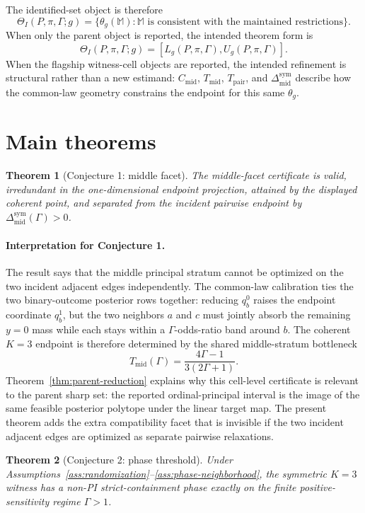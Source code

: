 \documentclass[11pt]{article}
\theoremstyle{definition}
\theoremstyle{plain}
\newtheorem{theorem}{Theorem}
\theoremstyle{remark}
\begin{document}
The identified-set object is therefore
\[
  \Theta_I(P,\pi,\Gamma;g)
  =
  \{\theta_g(\mathbb M): \mathbb M \text{ is consistent with the maintained restrictions}\}.
\]
When only the parent object is reported, the intended theorem form is
\[
  \Theta_I(P,\pi,\Gamma;g)=[L_g(P,\pi,\Gamma),U_g(P,\pi,\Gamma)].
\]
When the flagship witness-cell objects are reported, the intended refinement is structural rather than a new estimand: \(C_{\mathrm{mid}}\), \(T_{\mathrm{mid}}\), \(T_{\mathrm{pair}}\), and \(\Delta_{\mathrm{mid}}^{\mathrm{sym}}\) describe how the common-law geometry constrains the endpoint for this same \(\theta_g\).

\section{Main theorems}
\begin{theorem}[Conjecture 1: middle facet]\label{thm:middle-facet}
The middle-facet certificate is valid, irredundant in the one-dimensional endpoint projection, attained by the displayed coherent point, and separated from the incident pairwise endpoint by \(\Delta_{\mathrm{mid}}^{\mathrm{sym}}(\Gamma)>0\).
\end{theorem}

\paragraph{Interpretation for Conjecture 1.}
The result says that the middle principal stratum cannot be optimized on the two incident adjacent edges independently.  The common-law calibration ties the two binary-outcome posterior rows together: reducing \(q_b^0\) raises the endpoint coordinate \(q_b^1\), but the two neighbors \(a\) and \(c\) must jointly absorb the remaining \(y=0\) mass while each stays within a \(\Gamma\)-odds-ratio band around \(b\).  The coherent \(K=3\) endpoint is therefore determined by the shared middle-stratum bottleneck
\[
  T_{\mathrm{mid}}(\Gamma)=\frac{4\Gamma-1}{3(2\Gamma+1)}.
\]
Theorem~\ref{thm:parent-reduction} explains why this cell-level certificate is relevant to the parent sharp set: the reported ordinal-principal interval is the image of the same feasible posterior polytope under the linear target map.  The present theorem adds the extra compatibility facet that is invisible if the two incident adjacent edges are optimized as separate pairwise relaxations.

\begin{theorem}[Conjecture 2: phase threshold]\label{thm:phase-threshold}
Under Assumptions~\ref{ass:randomization}--\ref{ass:phase-neighborhood}, the symmetric \(K=3\) witness has a non-PI strict-containment phase exactly on the finite positive-sensitivity regime \(\Gamma>1\).
\end{theorem}
\end{document}
